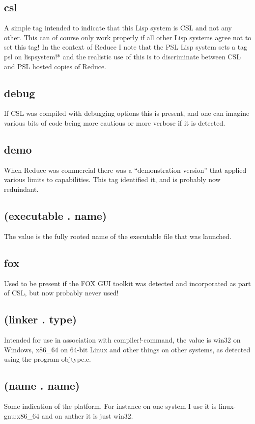 \documentclass[a4paper,11pt]{article}
\begin{document}
\subsection{\ttfamily csl}
A simple tag intended to indicate that this Lisp system is CSL and not any
other. This can of course only work properly if all other Lisp systems
agree not to set this tag! In the context of Reduce I note that the PSL
Lisp system sets a tag {\ttfamily psl} on {\ttfamily lispsystem!*} and
the realistic use of this is to discriminate between CSL and PSL hosted
copies of Reduce.
\subsection{\ttfamily debug}
If CSL was compiled with debugging options this is present, and one can imagine
various bits of code being more cautious or more verbose if it is detected.
\subsection{\ttfamily demo}
When Reduce was commercial there was a ``demonstration version'' that
applied various limits to capabilities. This tag identified it, and is probably
now reduindant.
\subsection{\ttfamily (executable . name)}
The value is the fully rooted name of the executable file that was launched.
\subsection{\ttfamily fox}
Used to be present if the FOX GUI toolkit was detected and incorporated as
part of CSL, but now probably never used!
\subsection{\ttfamily (linker . type)}
Intended for use in association with {\ttfamily compiler!-command}, the value
is {\ttfamily win32} on Windows, {\ttfamily x86\_64} on 64-bit Linux and
other things on other systems, as detected using the program {\ttfamily
objtype.c}.
\subsection{\ttfamily (name . name)}
Some indication of the platform. For instance on one system I use it
is {\ttfamily linux-gnu:x86\_64} and on anther it is just {\ttfamily win32}.
\end{document}

